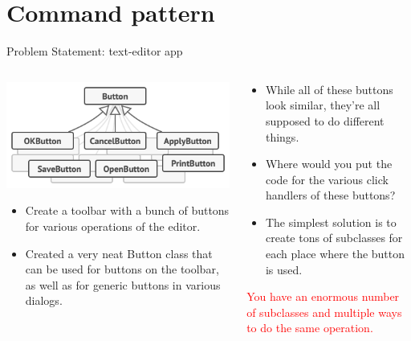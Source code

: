\documentclass[13pt]{beamer}
\begin{document}
\section{Command pattern}

\begin{frame}{Problem Statement: text-editor app}
	\begin{columns}[T]
		\begin{column}{.5\textwidth}
			\includegraphics[scale=0.4]{./images/problem.png}
			\begin{itemize}
				\item Create a toolbar with a bunch of buttons for various operations of the editor.
				\item Created a very neat Button class that can be used for buttons on the toolbar, as well as for generic buttons in various dialogs.
			\end{itemize}
		\end{column}
	
		\begin{column}{.5\textwidth}
			\begin{itemize}
				\item While all of these buttons look similar, they’re all supposed to do different things.
				\item Where would you put the code for the various click handlers of these buttons? 
				\item The simplest solution is to create tons of subclasses for each place where the button is used.
			\end{itemize}
			\textcolor{red}{You have an enormous number of subclasses and multiple ways to do the same operation.}
		\end{column}
	\end{columns}
\end{frame}
\end{document}
